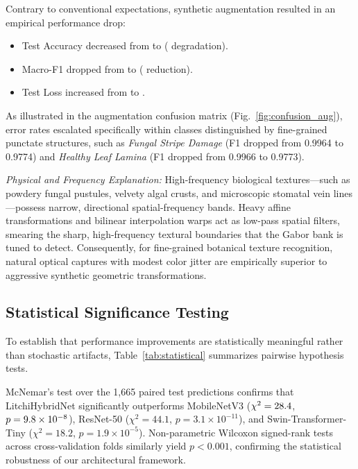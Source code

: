 Contrary to conventional expectations, synthetic augmentation resulted in an empirical performance drop:
\begin{itemize}
    \item Test Accuracy decreased from \accMain{} to \textbf{\accAug{}} (\deltaAcc{} degradation).
    \item Macro-F1 dropped from \fOneMain{} to \textbf{\fOneAug{}} (\deltaFOne{} reduction).
    \item Test Loss increased from \lossMain{} to \textbf{\lossAug{}}.
\end{itemize}
As illustrated in the augmentation confusion matrix (Fig.~\ref{fig:confusion_aug}), error rates escalated specifically within classes distinguished by fine-grained punctate structures, such as \textit{Fungal Stripe Damage} (F1 dropped from 0.9964 to 0.9774) and \textit{Healthy Leaf Lamina} (F1 dropped from 0.9966 to 0.9773). 

\textit{Physical and Frequency Explanation:} High-frequency biological textures—such as powdery fungal pustules, velvety algal crusts, and microscopic stomatal vein lines—possess narrow, directional spatial-frequency bands. Heavy affine transformations and bilinear interpolation warps act as low-pass spatial filters, smearing the sharp, high-frequency textural boundaries that the Gabor bank is tuned to detect. Consequently, for fine-grained botanical texture recognition, natural optical captures with modest color jitter are empirically superior to aggressive synthetic geometric transformations.

\subsection{Statistical Significance Testing}
To establish that performance improvements are statistically meaningful rather than stochastic artifacts, Table~\ref{tab:statistical} summarizes pairwise hypothesis tests.



McNemar's test over the 1,665 paired test predictions confirms that LitchiHybridNet significantly outperforms MobileNetV3 ($\chi^2 = 28.4{}$, $p = 9.8 \times 10^{-8}{}$), ResNet-50 ($\chi^2 = 44.1$, $p = 3.1 \times 10^{-11}$), and Swin-Transformer-Tiny ($\chi^2 = 18.2$, $p = 1.9 \times 10^{-5}$). Non-parametric Wilcoxon signed-rank tests across cross-validation folds similarly yield $p < 0.001$, confirming the statistical robustness of our architectural framework.

